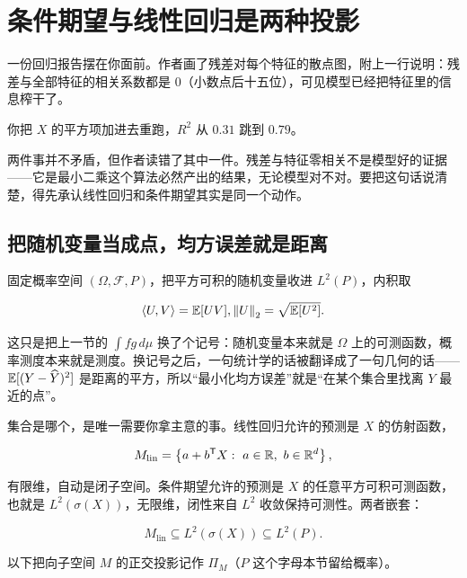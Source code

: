 \section{条件期望与线性回归是两种投影}
\label{sec:12-Real-Analysis-Support/07-Lp-Spaces-and-Function-Geometry/04}

一份回归报告摆在你面前。作者画了残差对每个特征的散点图，附上一行说明：残差与全部特征的相关系数都是 \(0\)（小数点后十五位），可见模型已经把特征里的信息榨干了。

你把 \(X\) 的平方项加进去重跑，\(R^2\) 从 \(0.31\) 跳到 \(0.79\)。

两件事并不矛盾，但作者读错了其中一件。残差与特征零相关不是模型好的证据——它是最小二乘这个算法必然产出的结果，无论模型对不对。要把这句话说清楚，得先承认线性回归和条件期望其实是同一个动作。

\subsection{把随机变量当成点，均方误差就是距离}

固定概率空间 \((\Omega,\mathcal F,P)\)，把平方可积的随机变量收进 \(L^2(P)\)，内积取

\[
\left\langle U,V\right\rangle=\mathbb{E}[UV],\space \left\lVert U\right\rVert_2=\sqrt{\mathbb{E}[U^2]} .
\]

这只是把上一节的 \(\int fg\,d\mu\) 换了个记号：随机变量本来就是 \(\Omega\) 上的可测函数，概率测度本来就是测度。换记号之后，一句统计学的话被翻译成了一句几何的话——\(\mathbb{E}[(Y-\widehat Y)^2]\) 是距离的平方，所以``最小化均方误差''就是``在某个集合里找离 \(Y\) 最近的点''。

集合是哪个，是唯一需要你拿主意的事。线性回归允许的预测是 \(X\) 的仿射函数，

\[
M_{\mathrm{lin}}=\set{a+b^{\trans}X:\ a\in\R,\ b\in\R^d} ,
\]

有限维，自动是闭子空间。条件期望允许的预测是 \(X\) 的任意平方可积可测函数，也就是 \(L^2(\sigma(X))\)，无限维，闭性来自 \(L^2\) 收敛保持可测性。两者嵌套：

\[
M_{\mathrm{lin}}\subseteq L^2(\sigma(X))\subseteq L^2(P) .
\]

以下把向子空间 \(M\) 的正交投影记作 \(\Pi_M\)（\(P\) 这个字母本节留给概率）。

